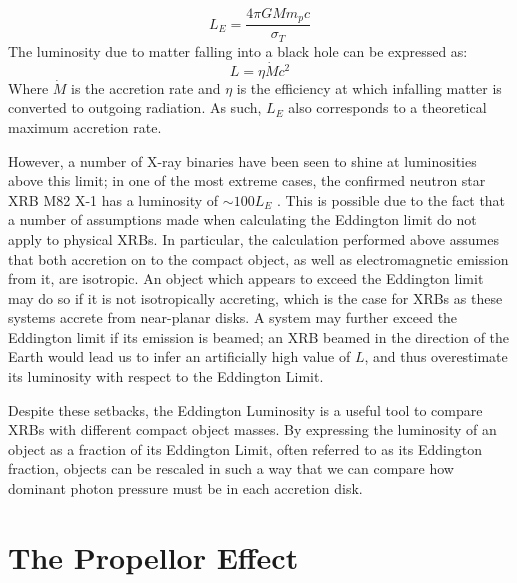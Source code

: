 \begin{equation}
L_E=\frac{4\pi GMm_pc}{\sigma_T}
\end{equation}
The luminosity due to matter falling into a black hole can be expressed as:
\begin{equation}
L=\eta\dot{M}c^2
\end{equation}
Where $\dot{M}$ is the accretion rate and $\eta$ is the efficiency at which infalling matter is converted to outgoing radiation.  As such, $L_E$ also corresponds to a theoretical maximum accretion rate.
\par However, a number of X-ray binaries have been seen to shine at luminosities above this limit; in one of the most extreme cases, the confirmed neutron star XRB M82 X-1 has a luminosity of $\sim100L_E$ \citep{Bachetti_M82X1}.  This is possible due to the fact that a number of assumptions made when calculating the Eddington limit do not apply to physical XRBs.  In particular, the calculation performed above assumes that both accretion on to the compact object, as well as electromagnetic emission from it, are isotropic.  An object which appears to exceed the Eddington limit may do so if it is not isotropically accreting, which is the case for XRBs as these systems accrete from near-planar disks.  A system may further exceed the Eddington limit if its emission is beamed; an XRB beamed in the direction of the Earth would lead us to infer an artificially high value of $L$, and thus overestimate its luminosity with respect to the Eddington Limit.
\par Despite these setbacks, the Eddington Luminosity is a useful tool to compare XRBs with different compact object masses.  By expressing the luminosity of an object as a fraction of its Eddington Limit, often referred to as its Eddington fraction, objects can be rescaled in such a way that we can compare how dominant photon pressure must be in each accretion disk.

\section{The Propellor Effect}

\label{sec:prop}

